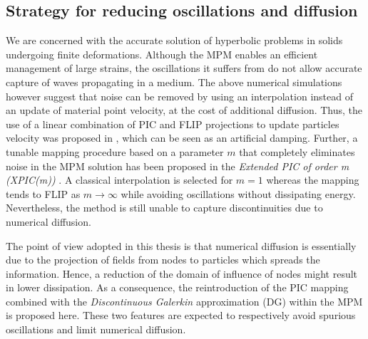 \subsection{Strategy for reducing oscillations and diffusion}
We are concerned with the accurate solution of hyperbolic problems in solids undergoing finite deformations.
Although the MPM enables an efficient management of large strains, the oscillations it suffers from do not allow accurate capture of waves propagating in a medium.
The above numerical simulations however suggest that noise can be removed by using an interpolation instead of an update of material point velocity, at the cost of additional diffusion.
Thus, the use of  a linear combination of PIC and FLIP projections to update particles velocity was proposed in \cite{Nairn}, which can be seen as an artificial damping.
Further, a tunable mapping procedure based on a parameter $m$ that completely eliminates noise in the MPM solution has been proposed in the \textit{Extended PIC of order m (XPIC(m))} \cite{XPIC}.
A classical interpolation is selected for $m=1$ whereas the mapping tends to FLIP as $m \rightarrow \infty$ while avoiding oscillations without dissipating energy.
Nevertheless, the method is still unable to capture discontinuities due to numerical diffusion.

The point of view adopted in this thesis is that numerical diffusion is essentially due to the projection of fields from nodes to particles which spreads the information.
Hence, a reduction of the domain of influence of nodes might result in lower dissipation.
As a consequence, the reintroduction of the PIC mapping combined with the \textit{Discontinuous Galerkin} approximation (DG) within the MPM is proposed here.
These two features are expected to respectively avoid spurious oscillations and limit numerical diffusion.


